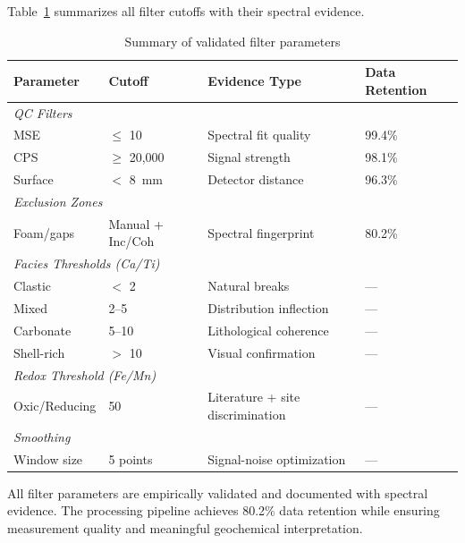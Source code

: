 Table~\ref{tab:filter_summary} summarizes all filter cutoffs with their spectral evidence.

\begin{table}[htbp]
\centering
\caption{Summary of validated filter parameters}
\label{tab:filter_summary}
\begin{tabular}{llll}
\toprule
Parameter & Cutoff & Evidence Type & Data Retention \\
\midrule
\multicolumn{4}{l}{\textit{QC Filters}} \\
MSE & $\leq$ 10 & Spectral fit quality & 99.4\% \\
CPS & $\geq$ 20,000 & Signal strength & 98.1\% \\
Surface & $<$ 8~mm & Detector distance & 96.3\% \\
\midrule
\multicolumn{4}{l}{\textit{Exclusion Zones}} \\
Foam/gaps & Manual + Inc/Coh & Spectral fingerprint & 80.2\% \\
\midrule
\multicolumn{4}{l}{\textit{Facies Thresholds (Ca/Ti)}} \\
Clastic & $<$ 2 & Natural breaks & --- \\
Mixed & 2--5 & Distribution inflection & --- \\
Carbonate & 5--10 & Lithological coherence & --- \\
Shell-rich & $>$ 10 & Visual confirmation & --- \\
\midrule
\multicolumn{4}{l}{\textit{Redox Threshold (Fe/Mn)}} \\
Oxic/Reducing & 50 & Literature + site discrimination & --- \\
\midrule
\multicolumn{4}{l}{\textit{Smoothing}} \\
Window size & 5 points & Signal-noise optimization & --- \\
\bottomrule
\end{tabular}
\end{table}

All filter parameters are empirically validated and documented with spectral evidence. The processing pipeline achieves 80.2\% data retention while ensuring measurement quality and meaningful geochemical interpretation.
